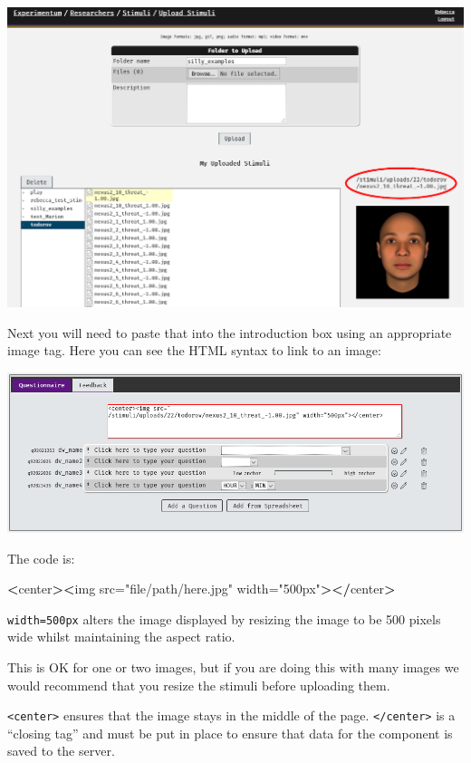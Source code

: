 \documentclass[]{book}
\newenvironment{Shaded}{\begin{snugshade}}{\end{snugshade}}
\newcommand{\StringTok}[1]{\textcolor[rgb]{0.31,0.60,0.02}{#1}}
\newcommand{\OperatorTok}[1]{\textcolor[rgb]{0.81,0.36,0.00}{\textbf{#1}}}
\newcommand{\ErrorTok}[1]{\textcolor[rgb]{0.64,0.00,0.00}{\textbf{#1}}}
\newcommand{\NormalTok}[1]{#1}
\begin{document}
\includegraphics{images/screenshots/quest_stim_1.png}

Next you will need to paste that into the introduction box using an
appropriate image tag. Here you can see the HTML syntax to link to an
image:

\includegraphics{images/screenshots/quest_stim_2.png}

The code is:

\begin{Shaded}
\begin{Highlighting}[]
\OperatorTok{<}\NormalTok{center}\OperatorTok{>}\ErrorTok{<}\NormalTok{img src=}\StringTok{"file/path/here.jpg"}\NormalTok{ width=}\StringTok{"500px"}\OperatorTok{>}\ErrorTok{</}\NormalTok{center}\OperatorTok{>}
\end{Highlighting}
\end{Shaded}

\texttt{width=500px} alters the image displayed by resizing the image to
be 500 pixels wide whilst maintaining the aspect ratio.

This is OK for one or two images, but if you are doing this with many
images we would recommend that you resize the stimuli before uploading
them.

\texttt{\textless{}center\textgreater{}} ensures that the image stays in
the middle of the page. \texttt{\textless{}/center\textgreater{}} is a
``closing tag'' and must be put in place to ensure that data for the
component is saved to the server.
\end{document}
